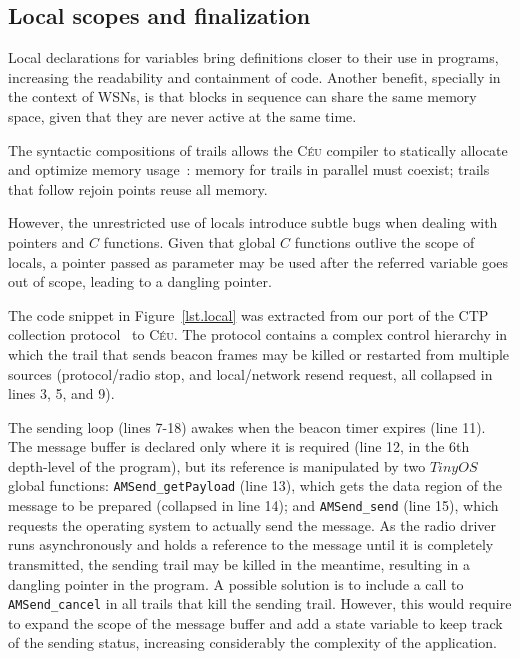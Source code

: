 \documentclass[10pt]{sensys-proc}
\newcommand{\CEU}{\textsc{C\'{e}u}\xspace}
\newcommand{\code}[1] {{\small{\texttt{#1}}}}
\begin{document}
\subsection{Local scopes and finalization}
\label{sec.ceu.local}

Local declarations for variables bring definitions closer to their use in 
programs, increasing the readability and containment of code.
Another benefit, specially in the context of WSNs, is that blocks in sequence 
can share the same memory space, given that they are never active at the same 
time.

The syntactic compositions of trails allows the \CEU compiler to statically 
allocate and optimize memory usage~\cite{wsn.osm}:
memory for trails in parallel must coexist;
trails that follow rejoin points reuse all memory.

However, the unrestricted use of locals introduce subtle bugs when dealing with 
pointers and $C$ functions.
Given that global $C$ functions outlive the scope of locals, a pointer passed 
as parameter may be used after the referred variable goes out of scope, leading 
to a dangling pointer.

The code snippet in Figure~\ref{lst.local} was extracted from our port of the 
CTP collection protocol~\cite{wsn.teps} to \CEU.
The protocol contains a complex control hierarchy in which the trail that sends 
beacon frames may be killed or restarted from multiple sources (protocol/radio 
stop, and local/network resend request, all collapsed in lines 3, 5, and 9).

The sending loop (lines 7-18) awakes when the beacon timer expires (line 11).
The message buffer is declared only where it is required (line 12, in the 6th 
depth-level of the program), but its reference is manipulated by two $TinyOS$ 
global functions:
\code{AMSend\_getPayload} (line 13), which gets the data region of the message 
to be prepared (collapsed in line 14);
and \code{AMSend\_send} (line 15), which requests the operating system to 
actually send the message.
As the radio driver runs asynchronously and holds a reference to the message 
until it is completely transmitted, the sending trail may be killed in the 
meantime, resulting in a dangling pointer in the program.
%
A possible solution is to include a call to \code{AMSend\_cancel} in all trails 
that kill the sending trail.
However, this would require to expand the scope of the message buffer and add a 
state variable to keep track of the sending status, increasing considerably the 
complexity of the application.
\end{document}
